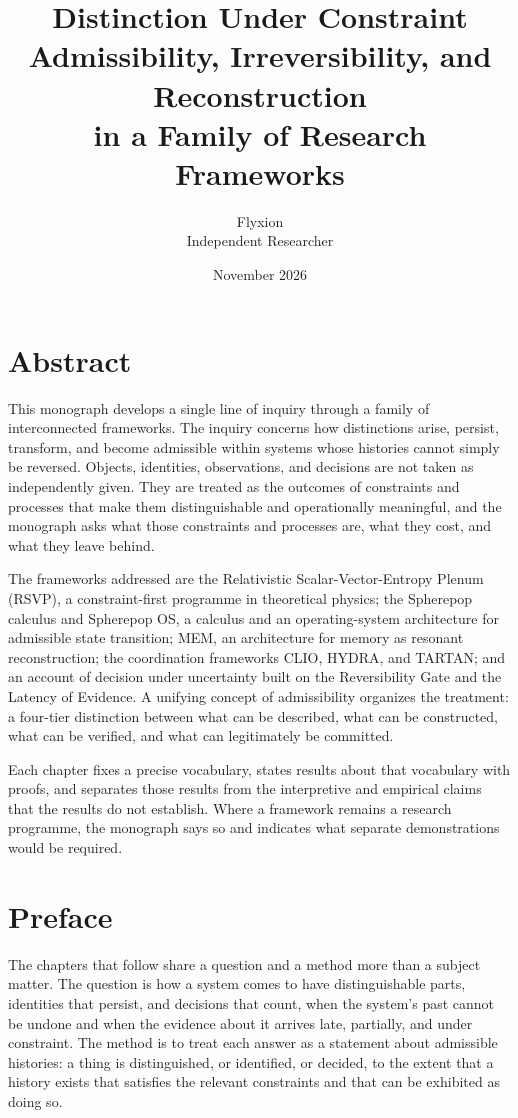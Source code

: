 \documentclass[11pt,twoside,openright]{book}
\title{\Huge\bfseries Distinction Under Constraint\\[0.6em]
\Large\mdseries Admissibility, Irreversibility, and Reconstruction\\ in a Family of Research Frameworks}
\author{\Large Flyxion\\[0.3em]\normalsize Independent Researcher}
\date{November 2026}
\theoremstyle{plain}
\theoremstyle{definition}
\theoremstyle{remark}
\newcommand{\memeight}{\mbox{MEM\textbar 8}}
\newcommand{\rsvp}{RSVP}
\begin{document}
\frontmatter
\maketitle

\chapter*{Abstract}

This monograph develops a single line of inquiry through a family of interconnected frameworks. The inquiry concerns how distinctions arise, persist, transform, and become admissible within systems whose histories cannot simply be reversed. Objects, identities, observations, and decisions are not taken as independently given. They are treated as the outcomes of constraints and processes that make them distinguishable and operationally meaningful, and the monograph asks what those constraints and processes are, what they cost, and what they leave behind.

The frameworks addressed are the Relativistic Scalar-Vector-Entropy Plenum (\rsvp{}), a constraint-first programme in theoretical physics; the Spherepop calculus and Spherepop OS, a calculus and an operating-system architecture for admissible state transition; \memeight{}, an architecture for memory as resonant reconstruction; the coordination frameworks CLIO, HYDRA, and TARTAN; and an account of decision under uncertainty built on the Reversibility Gate and the Latency of Evidence. A unifying concept of admissibility organizes the treatment: a four-tier distinction between what can be described, what can be constructed, what can be verified, and what can legitimately be committed.

Each chapter fixes a precise vocabulary, states results about that vocabulary with proofs, and separates those results from the interpretive and empirical claims that the results do not establish. Where a framework remains a research programme, the monograph says so and indicates what separate demonstrations would be required.

\chapter*{Preface}

The chapters that follow share a question and a method more than a subject matter. The question is how a system comes to have distinguishable parts, identities that persist, and decisions that count, when the system's past cannot be undone and when the evidence about it arrives late, partially, and under constraint. The method is to treat each answer as a statement about admissible histories: a thing is distinguished, or identified, or decided, to the extent that a history exists that satisfies the relevant constraints and that can be exhibited as doing so.
\end{document}

